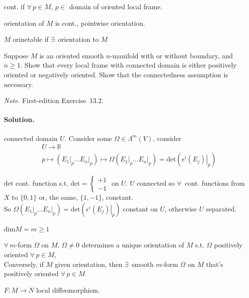 cont. if $\forall \, p \in M$, $p\in $ domain of oriented local frame.  

orientation of $M$ is cont., pointwise orientation.  

$M$ orinetable if $\exists \, $ orientation to $M$

\begin{exercise}
Suppose $M$ is an oriented smooth $n$-manifold with or without boundary, and $n\ge 1$. Show that every local frame with connected domain is either positively oriented or negatively oriented. Show that the connectedness assumption is necessary.
\end{exercise}
\noindent\emph{Note.} First-edition Exercise~13.2.
\paragraph{Solution.}  connected domain $U$.  Consider some $\Omega \in \Lambda^m(V)$,  consider 
\[
\begin{aligned}
  & U \to \mathbb{R} \\ 
  & p \mapsto ( \left. E_1 \right|_p \dots \left. E_n \right|_p ) \mapsto \Omega( \left. E_1 \right|_p \dots \left. E_n \right|_p ) = \text{det}{ ( \left.  \epsilon^i(E_j) \right|_p ) }
\end{aligned}
\]

$\text{det}$ cont. function s.t. $\text{det} = \begin{cases} +1 \\ -1 \end{cases}$ on $U$.  $U$ connected so $\forall \, $ cont. functions from $X$ to $\lbrace 0, 1 \rbrace$ or, the same, $\lbrace 1 , -1 \rbrace$, constant.  \\
So $\Omega( \left. E_1 \right|_p \dots \left. E_n \right|_p ) = \text{det}{ ( \left. \epsilon^i (E_j) \right|_p )}$ constant on $U$, otherwise $U$ separated.  

\begin{proposition}[13.4] 
$\text{dim}{M} = m \geq 1$ 

$\forall \, m$-form $\Omega$ on $M$, $\Omega\neq 0$ determines a unique orientation of $M$ s.t. $\Omega$ positively oriented $\forall \, p \in M$, \\
Conversely, if $M$ given orientation, then $\exists \, $ smooth $m$-form $\Omega$ on $M$ that's positively oriented $\forall \, p \in M$
\end{proposition}

$F:M \to N$ local diffeomorphism.  

